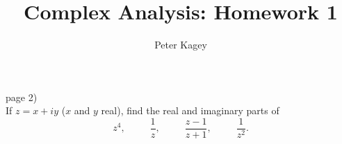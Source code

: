 \documentclass{article}
\newenvironment{problem}[2][Problem]{\begin{trivlist}
\item[\hskip \labelsep {\bfseries #1}\hskip \labelsep {\bfseries #2.}]}{\end{trivlist}}
\begin{document}
\title{Complex Analysis: Homework 1}
\author{Peter Kagey}

\maketitle

\begin{problem}{2} (page 2) \\
  If $z = x + iy$ ($x$ and $y$ real), find the real and imaginary parts of \[
    z^4, \hspace{30pt}
    \frac{1}{z}, \hspace{30pt}
    \frac{z - 1}{z + 1}, \hspace{30pt}
    \frac{1}{z^2}.
  \]
\end{problem}
\end{document}
